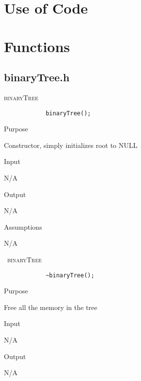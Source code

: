 \documentclass[pdftex, 12pt]{article}
\begin{document}
\section{Use of Code}

\section{Functions}

\subsection{binaryTree.h}
\begin{description}

	\item{\textsc{binaryTree}}
		\begin{lstlisting}
			binaryTree();
		\end{lstlisting}
		\begin{description}

			\item{Purpose}

				Constructor, simply initializes root to NULL

			\item{Input}

				N/A

			\item{Output}

				N/A

			\item{Assumptions}

				N/A

		\end{description}
	\item{\textsc{~binaryTree}}
		\begin{lstlisting}
			~binaryTree();
		\end{lstlisting}
		\begin{description}

			\item{Purpose}

				Free all the memory in the tree

			\item{Input}

				N/A

			\item{Output}

				N/A


\end{description}
\end{description}
\end{document}
